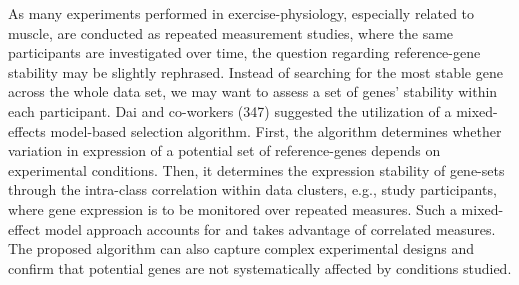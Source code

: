 \documentclass[twoside,10pt]{gihclass} %
\begin{document}
As many experiments performed in exercise-physiology, especially related to muscle, are conducted as repeated measurement studies, where the same participants are investigated over time, the question regarding reference-gene stability may be slightly rephrased. Instead of searching for the most stable gene across the whole data set, we may want to assess a set of genes' stability within each participant.
Dai and co-workers (347) suggested the utilization of a mixed-effects model-based selection algorithm.
First, the algorithm determines whether variation in expression of a potential set of reference-genes depends on experimental conditions.
Then, it determines the expression stability of gene-sets through the intra-class correlation within data clusters, e.g., study participants, where gene expression is to be monitored over repeated measures.
Such a mixed-effect model approach accounts for and takes advantage of correlated measures.
The proposed algorithm can also capture complex experimental designs and confirm that potential genes are not systematically affected by conditions studied.
\end{document}
